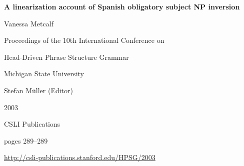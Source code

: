 \documentclass[a4paper,11pt]{article}
\begin{document}
\begin{center}
  {\huge\bf A linearization account of Spanish obligatory subject NP inversion\par}

  \bigskip

  {\LARGE Vanessa Metcalf\par}

  \vspace*{3\bigskipamount}

  Proceedings of the 10th International Conference on\par Head-Driven Phrase Structure Grammar

  \bigskip

  Michigan State University

  \medskip

  Stefan M{\"u}ller (Editor)

  \medskip

  2003

  \medskip

  CSLI Publications

  \medskip

  pages 289--289

  \medskip

  \url{http://csli-publications.stanford.edu/HPSG/2003}
\end{center}

\newpage

        
\end{document}
